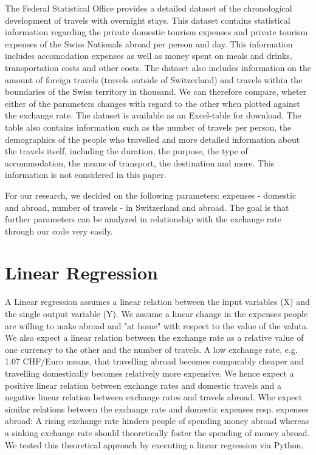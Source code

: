 \documentclass[12pt,a4paper,bibliography=totocnumbered,listof=totocnumbered]{scrartcl}
\begin{document}
The Federal Statistical Office provides a detailed dataset of the chronological development of travels with overnight stays. This dataset contains statistical information regarding the private domestic tourism expenses and private tourism expenses of the Swiss Nationals abroad per person and day. This information includes accomodation expenses as well as money spent on meals and drinks, transportation costs and other costs. The dataset also includes information on the amount of foreign travels (travels outside of Switzerland) and travels within the boundaries of the Swiss territory in thousand. We can therefore compare, wheter either of the parameters changes with regard to the other when plotted against the exchange rate. The dataset is available as an Excel-table for download. The table also contains information such as the number of travels per person, the demographics of the people who travelled and more detailed information about the travels itself, including the duration, the purpose, the type of accommodation, the means of transport, the destination and more. This information is not considered in this paper.

For our research, we decided on the following parameters: expenses - domestic and abroad, number of travels - in Switzerland and abroad. The goal is that further parameters can be analyzed in relationship with the exchange rate through our code very easily. 



\newpage
\section{Linear Regression}
A Linear regression assumes a linear relation between the input variables (X) and the single output variable (Y). We assume a linear change in the expenses people are willing to make abroad and "at home" with respect to the value of the valuta. We also expect a linear relation between the exchange rate as a relative value of one currency to the other and the number of travels. A low exchange rate, e.g. 1.07 CHF/Euro means, that travelling abroad becomes comparably cheaper and travelling domestically becomes relatively more expensive. We hence expect a positive linear relation between exchange rates and domestic travels and a negative linear relation between exchange rates and travels abroad. Whe expect similar relations between the exchange rate and domestic expenses resp. expenses abroad: A rising exchange rate hinders people of spending money abroad whereas a sinking exchange rate should theoretically foster the spending of money abroad.\\ We tested this theoretical approach by executing a linear regression via Python. \\
\end{document}
